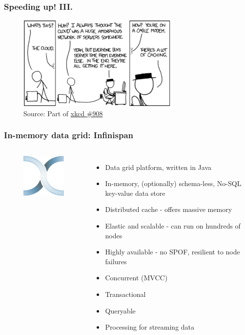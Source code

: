 \documentclass[10pt,utf8]{beamer}
\begin{document}
\begin{frame}
	\frametitle{Speeding up! III.}
	
	\vspace{0.5cm}
	\vspace{0.5cm}
	
	\begin{figure}
		\centering
		\includegraphics[width=8cm]{./img/xkcd_908.eps}
		\caption{\tiny{Source: Part of \href{http://xkcd.com/908/}{xkcd \#908}}}
	\end{figure}
\end{frame}

\begin{frame}
	\frametitle{In-memory data grid: Infinispan}
	\begin{columns}
		\begin{figure}
			\centering
			\includegraphics[width=3cm]{./img/infinispan.eps}
		\end{figure}
		\begin{itemize}
			\item Data grid platform, written in Java
			\item In-memory, (optionally) schema-less, No-SQL key-value data store
			\item Distributed cache - offers massive memory
			\item Elastic and scalable - can run on hundreds of nodes
			\item Highly available - no SPOF, resilient to node failures
			\item Concurrent (MVCC)
			\item Transactional
			\item Queryable
			\item Processing for streaming data
		\end{itemize}
	\end{columns}
\end{frame}
\end{document}
